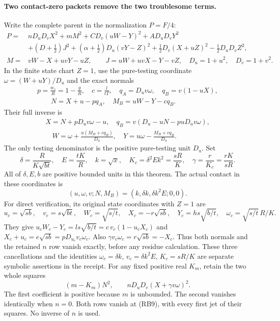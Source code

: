 \paragraph{Two contact-zero packets remove the two troublesome terms.}
Write the complete parent in the normalization $P=F/4$:
\[
\begin{split}
 P={}&nD_uD_vX^2+mM^2+C D_v(uW-Y)^2+A D_uD_vY^2\\
 &+(D+\tfrac12)J^2+(\alpha+\tfrac12)D_u(vY-Z)^2
       +\tfrac12D_v(X+uZ)^2-\tfrac12D_uD_vZ^2,\\
 M={}&vW-X+uvY-uZ,\qquad J=uW+uvX-Y-vZ,
 \quad D_u=1+u^2,\quad D_v=1+v^2.
\end{split}                                                     \tag{RB5}
\]
In the finite state chart $Z=1$, use the pure-testing coordinate
$\omega=(W+uY)/D_u$ and the exact normals
\[
\begin{gathered}
 p=\frac{w_s}{R}=1-\frac gR,\quad c=\frac{l}{tT},\quad
 q_A=D_uv\omega,\quad q_B=v(1-uX),\\
 \qquad N=X+u-pq_A,\quad M_B=uW-Y-cq_B.
\end{gathered}                                    \tag{RB6}
\]
Their full inverse is
\[
\begin{gathered}
 X=N+pD_uv\omega-u,\quad q_B=v(D_u-uN-puD_uv\omega),\\
 \quad W=\omega+\frac{u(M_B+cq_B)}{D_u},\quad
 Y=u\omega-\frac{M_B+cq_B}{D_u}.
\end{gathered}                                    \tag{RB7}
\]
The only testing denominator is the positive pure-testing unit $D_u$.
Set
\[
 \delta=\frac{R}{K\sqrt{bt}},\quad E=\frac{tK}{R},\quad
 k=\sqrt x,\quad K_c=\delta^2Ek^2=\frac{sR}{K},\quad
 \gamma=\frac r{K_c}=\frac{rK}{sR}.                \tag{RB8}
\]
All of $\delta,E,b$ are positive bounded units in this theorem.
The actual contact in these coordinates is
\[
 (u,\omega,v;N,M_B)=(k,\delta k,\delta k^2E;0,0).
 \tag{RB9}
\]
For direct verification, its original state coordinates with $Z=1$ are
\[
 u_c=\sqrt{sb},\quad v_c=s\sqrt{bt},\quad
 W_c=\sqrt{s/t},\quad X_c=-r\sqrt{sb},\quad
 Y_c=hs\sqrt{b/t},\quad
 \omega_c=\sqrt{s/t}\,R/K.
 \tag{RB9a}
\]
They give $u_cW_c-Y_c=ls\sqrt{b/t}=c\,v_c(1-u_cX_c)$
and $X_c+u_c=e\sqrt{sb}=pD_{u_c}v_c\omega_c$.
Also $\gamma v_c\omega_c=r\sqrt{sb}=-X_c$.
Thus both normals and the retained $n$ row vanish exactly, before
any residue calculation. These three cancellations and the identities
$\omega_c=\delta k$, $v_c=\delta k^2E$, $K_c=sR/K$
are separate symbolic assertions in the receipt.
For any fixed positive real $K_m$, retain the two whole squares
\[
 (m-K_m)N^2,
 \qquad nD_uD_v(X+\gamma v\omega)^2.                \tag{RB10}
\]
The first coefficient is positive because $m$ is unbounded. The second
vanishes identically when $n=0$. Both rows vanish at (RB9), with every
first jet of their squares. No inverse of $n$ is used.

